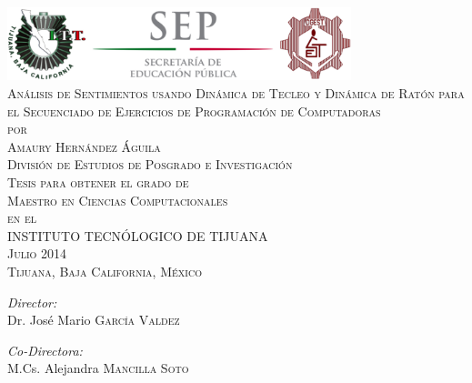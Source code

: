 \begin{titlepage}
  \begin{center}
    \includegraphics[width=0.75\textwidth]{./logos.png}~\\[1cm]
    \textsc{\LARGE Análisis de Sentimientos usando Dinámica de Tecleo y Dinámica
  de Ratón para el Secuenciado de Ejercicios de Programación de
  Computadoras}~\\[0.5cm]
\textsc{por}~\\[0.5cm]
\textsc{\Large Amaury Hernández Águila}~\\[2.0cm]

\textsc{\Large División de Estudios de Posgrado e Investigación}~\\[0.5cm]
\textsc{Tesis para obtener el grado de}~\\[0.5cm]
\textsc{\Large Maestro en Ciencias Computacionales}~\\[0.5cm]
\textsc{en el}~\\[0.5cm]
\textsc{\Large INSTITUTO TECNÓLOGICO DE TIJUANA}~\\[1cm]
\textsc{Julio 2014}~\\[0.2cm]
\textsc{Tijuana, Baja California, México}~\\[1cm]

\begin{minipage}{1.5\textwidth}
  \begin{flushleft} \large
    \emph{Director:}\\
    Dr. José Mario \textsc{García Valdez}
  \end{flushleft}
\end{minipage}

\begin{minipage}{1.5\textwidth}
\begin{flushleft} \large
\emph{Co-Directora:} \\
M.Cs. Alejandra \textsc{Mancilla Soto}
\end{flushleft}
\end{minipage}

\vfill

  \end{center}

\end{titlepage}



